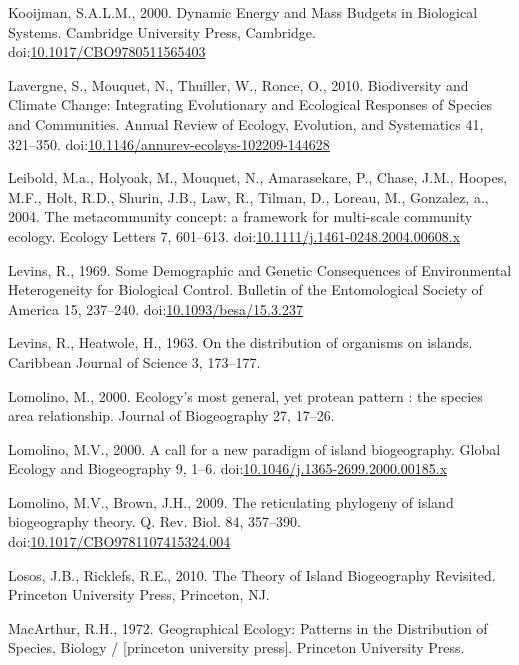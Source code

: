 \hypertarget{ref-Kooijman2000a}{}
Kooijman, S.A.L.M., 2000. Dynamic Energy and Mass Budgets in Biological
Systems. Cambridge University Press, Cambridge.
doi:\href{https://doi.org/10.1017/CBO9780511565403}{10.1017/CBO9780511565403}

\hypertarget{ref-Lavergne2010}{}
Lavergne, S., Mouquet, N., Thuiller, W., Ronce, O., 2010. Biodiversity
and Climate Change: Integrating Evolutionary and Ecological Responses of
Species and Communities. Annual Review of Ecology, Evolution, and
Systematics 41, 321--350.
doi:\href{https://doi.org/10.1146/annurev-ecolsys-102209-144628}{10.1146/annurev-ecolsys-102209-144628}

\hypertarget{ref-Leibold2004}{}
Leibold, M.a., Holyoak, M., Mouquet, N., Amarasekare, P., Chase, J.M.,
Hoopes, M.F., Holt, R.D., Shurin, J.B., Law, R., Tilman, D., Loreau, M.,
Gonzalez, a., 2004. The metacommunity concept: a framework for
multi-scale community ecology. Ecology Letters 7, 601--613.
doi:\href{https://doi.org/10.1111/j.1461-0248.2004.00608.x}{10.1111/j.1461-0248.2004.00608.x}

\hypertarget{ref-Levins1969}{}
Levins, R., 1969. Some Demographic and Genetic Consequences of
Environmental Heterogeneity for Biological Control. Bulletin of the
Entomological Society of America 15, 237--240.
doi:\href{https://doi.org/10.1093/besa/15.3.237}{10.1093/besa/15.3.237}

\hypertarget{ref-Levins1963}{}
Levins, R., Heatwole, H., 1963. On the distribution of organisms on
islands. Caribbean Journal of Science 3, 173--177.

\hypertarget{ref-Lomolino2000a}{}
Lomolino, M., 2000. Ecology's most general, yet protean pattern : the
species area relationship. Journal of Biogeography 27, 17--26.

\hypertarget{ref-Lomolino2000}{}
Lomolino, M.V., 2000. A call for a new paradigm of island biogeography.
Global Ecology and Biogeography 9, 1--6.
doi:\href{https://doi.org/10.1046/j.1365-2699.2000.00185.x}{10.1046/j.1365-2699.2000.00185.x}

\hypertarget{ref-Lomolino2009}{}
Lomolino, M.V., Brown, J.H., 2009. The reticulating phylogeny of island
biogeography theory. Q. Rev. Biol. 84, 357--390.
doi:\href{https://doi.org/10.1017/CBO9781107415324.004}{10.1017/CBO9781107415324.004}

\hypertarget{ref-Losos2010}{}
Losos, J.B., Ricklefs, R.E., 2010. The Theory of Island Biogeography
Revisited. Princeton University Press, Princeton, NJ.

\hypertarget{ref-macarthur1972geographical}{}
MacArthur, R.H., 1972. Geographical Ecology: Patterns in the
Distribution of Species, Biology / {[}princeton university press{]}.
Princeton University Press.

